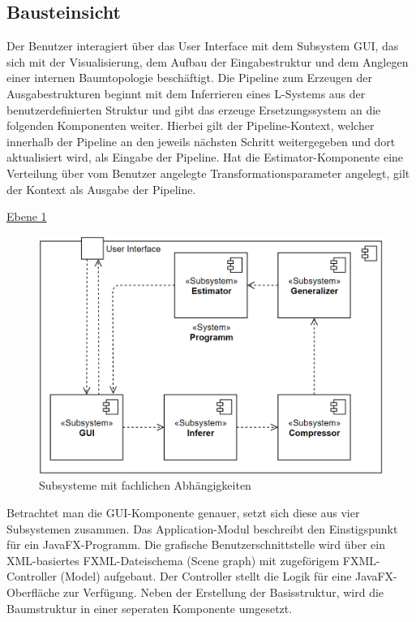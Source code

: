 \subsection*{Bausteinsicht}
Der Benutzer interagiert über das User Interface mit dem Subsystem GUI, das sich mit der Visualisierung, dem Aufbau der
Eingabestruktur und dem Anglegen einer internen Baumtopologie beschäftigt.
Die Pipeline zum Erzeugen der Ausgabestrukturen beginnt mit dem Inferrieren eines L-Systems aus der benutzerdefinierten
Struktur und gibt das erzeuge Ersetzungssystem an die folgenden Komponenten weiter.
Hierbei gilt der Pipeline-Kontext, welcher innerhalb der Pipeline an den jeweils nächsten Schritt weitergegeben und
dort aktualisiert wird, als Eingabe der Pipeline.
Hat die Estimator-Komponente eine Verteilung über vom Benutzer angelegte Transformationsparameter angelegt, gilt
der Kontext als Ausgabe der Pipeline.

\underline{Ebene 1}
\begin{figure}[H]
    \centering
    \includegraphics[width=12cm]{../images/Bausteinsicht_Ebene_1.PNG}
    \caption{Subsysteme mit fachlichen Abhängigkeiten}
\end{figure}

Betrachtet man die GUI-Komponente genauer, setzt sich diese aus vier Subsystemen zusammen.
Das Application-Modul beschreibt den Einstigspunkt für ein JavaFX-Programm.
Die grafische Benutzerschnittstelle wird über ein XML-basiertes FXML-Dateischema (Scene graph) mit zugeförigem FXML-Controller (Model)
aufgebaut.
Der Controller stellt die Logik für eine JavaFX-Oberfläche zur Verfügung.
Neben der Erstellung der Basisstruktur, wird die Baumstruktur in einer seperaten Komponente umgesetzt.

